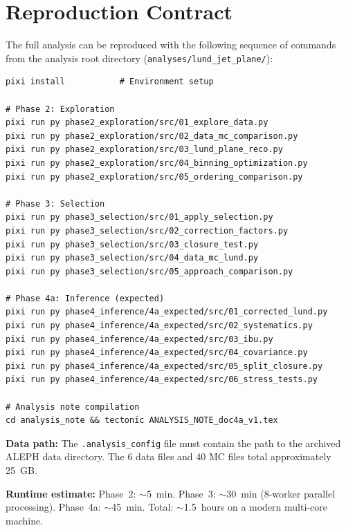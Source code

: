 \documentclass[11pt,a4paper]{article}
\begin{document}
\section{Reproduction Contract}
\label{app:reproduction}

The full analysis can be reproduced with the following sequence of
commands from the analysis root directory
(\texttt{analyses/lund\_jet\_plane/}):

{\small
\begin{verbatim}
pixi install           # Environment setup

# Phase 2: Exploration
pixi run py phase2_exploration/src/01_explore_data.py
pixi run py phase2_exploration/src/02_data_mc_comparison.py
pixi run py phase2_exploration/src/03_lund_plane_reco.py
pixi run py phase2_exploration/src/04_binning_optimization.py
pixi run py phase2_exploration/src/05_ordering_comparison.py

# Phase 3: Selection
pixi run py phase3_selection/src/01_apply_selection.py
pixi run py phase3_selection/src/02_correction_factors.py
pixi run py phase3_selection/src/03_closure_test.py
pixi run py phase3_selection/src/04_data_mc_lund.py
pixi run py phase3_selection/src/05_approach_comparison.py

# Phase 4a: Inference (expected)
pixi run py phase4_inference/4a_expected/src/01_corrected_lund.py
pixi run py phase4_inference/4a_expected/src/02_systematics.py
pixi run py phase4_inference/4a_expected/src/03_ibu.py
pixi run py phase4_inference/4a_expected/src/04_covariance.py
pixi run py phase4_inference/4a_expected/src/05_split_closure.py
pixi run py phase4_inference/4a_expected/src/06_stress_tests.py

# Analysis note compilation
cd analysis_note && tectonic ANALYSIS_NOTE_doc4a_v1.tex
\end{verbatim}
}

\textbf{Data path:} The \texttt{.analysis\_config} file must contain
the path to the archived ALEPH data directory.  The 6 data files and
40 MC files total approximately 25~GB.

\textbf{Runtime estimate:} Phase~2: $\sim$5~min.  Phase~3: $\sim$30~min
(8-worker parallel processing).  Phase~4a: $\sim$45~min.  Total:
$\sim$1.5~hours on a modern multi-core machine.
\end{document}
